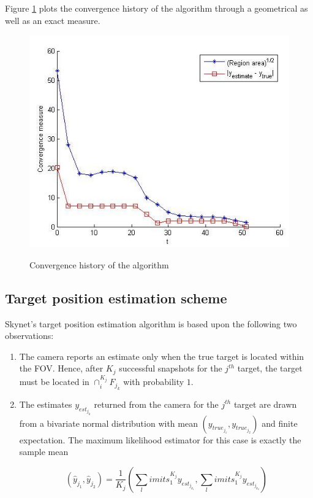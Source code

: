 Figure \ref{fig_mission_phase2_c} plots the convergence history of the algorithm through a geometrical as well as an exact measure.

\begin{figure}
\centering
\includegraphics[scale=1]{Figures/mission_phase2_c}
\label{fig_mission_phase2_c}
\caption{Convergence history of the algorithm}
\end{figure}


\subsection{Target position estimation scheme}

Skynet's target position estimation algorithm is based upon the following two observations:

\begin{enumerate}
\item The camera reports an estimate only when the true target is located within the FOV. Hence, after $K_j$ successful snapshots for the $j^{th}$ target, the target must be located in $\cap_i^{K_j} F_{j_k}$ with probability $1$.

\item The estimates $y_{est_{j_k}}$ returned from the camera for the $j^{th}$ target are drawn from a bivariate normal distribution with mean $(y_{true_{j_1}}, y_{true_{j_2}})$ and finite expectation. The maximum likelihood estimator for this case is exactly the sample mean 

\[ (\hat{y}_{j_1}, \hat{y}_{j_2}) = \frac{1}{K_j} \left( \sum_limits_1^{K_j} y_{est_{j_{k_1}}}, \sum_limits_1^{K_j} y_{est_{j_{k_2}}} \right)\]

\end{enumerate}


